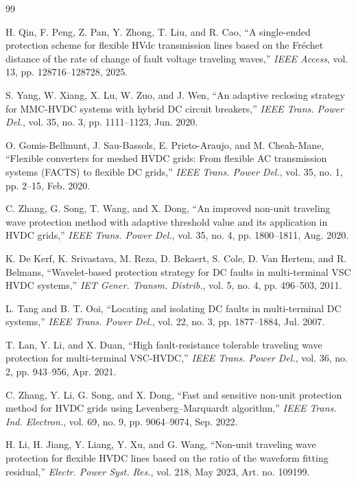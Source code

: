 \documentclass[journal]{IEEEtran}
\begin{document}
\begin{thebibliography}{99}

H. Qin, F. Peng, Z. Pan, Y. Zhong, T. Liu, and R. Cao, ``A single-ended protection scheme for flexible HVdc transmission lines based on the Fréchet distance of the rate of change of fault voltage traveling waves,'' \emph{IEEE Access}, vol. 13, pp. 128716--128728, 2025.

S. Yang, W. Xiang, X. Lu, W. Zuo, and J. Wen, ``An adaptive reclosing strategy for MMC-HVDC systems with hybrid DC circuit breakers,'' \emph{IEEE Trans. Power Del.}, vol. 35, no. 3, pp. 1111--1123, Jun. 2020.

O. Gomis-Bellmunt, J. Sau-Bassols, E. Prieto-Araujo, and M. Cheah-Mane, ``Flexible converters for meshed HVDC grids: From flexible AC transmission systems (FACTS) to flexible DC grids,'' \emph{IEEE Trans. Power Del.}, vol. 35, no. 1, pp. 2--15, Feb. 2020.

C. Zhang, G. Song, T. Wang, and X. Dong, ``An improved non-unit traveling wave protection method with adaptive threshold value and its application in HVDC grids,'' \emph{IEEE Trans. Power Del.}, vol. 35, no. 4, pp. 1800--1811, Aug. 2020.

K. De Kerf, K. Srivastava, M. Reza, D. Bekaert, S. Cole, D. Van Hertem, and R. Belmans, ``Wavelet-based protection strategy for DC faults in multi-terminal VSC HVDC systems,'' \emph{IET Gener. Transm. Distrib.}, vol. 5, no. 4, pp. 496--503, 2011.

L. Tang and B. T. Ooi, ``Locating and isolating DC faults in multi-terminal DC systems,'' \emph{IEEE Trans. Power Del.}, vol. 22, no. 3, pp. 1877--1884, Jul. 2007.

T. Lan, Y. Li, and X. Duan, ``High fault-resistance tolerable traveling wave protection for multi-terminal VSC-HVDC,'' \emph{IEEE Trans. Power Del.}, vol. 36, no. 2, pp. 943--956, Apr. 2021.

C. Zhang, Y. Li, G. Song, and X. Dong, ``Fast and sensitive non-unit protection method for HVDC grids using Levenberg–Marquardt algorithm,'' \emph{IEEE Trans. Ind. Electron.}, vol. 69, no. 9, pp. 9064--9074, Sep. 2022.

H. Li, H. Jiang, Y. Liang, Y. Xu, and G. Wang, ``Non-unit traveling wave protection for flexible HVDC lines based on the ratio of the waveform fitting residual,'' \emph{Electr. Power Syst. Res.}, vol. 218, May 2023, Art. no. 109199.


\end{thebibliography}
\end{document}
